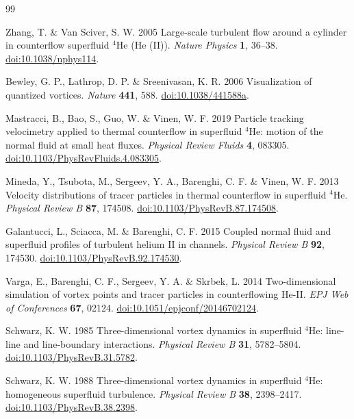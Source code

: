 \documentclass[11pt]{article}
\numberwithin{equation}{section}
\begin{document}
\begin{thebibliography}{99}

Zhang, T. \& Van Sciver, S. W. 2005
Large-scale turbulent flow around a cylinder in counterflow superfluid $^4$He (He (II)).
\textit{Nature Physics} \textbf{1}, 36--38.
\href{https://doi.org/10.1038/nphys114}{doi:10.1038/nphys114}.

Bewley, G. P., Lathrop, D. P. \& Sreenivasan, K. R. 2006
Visualization of quantized vortices.
\textit{Nature} \textbf{441}, 588.
\href{https://doi.org/10.1038/441588a}{doi:10.1038/441588a}.

Mastracci, B., Bao, S., Guo, W. \& Vinen, W. F. 2019
Particle tracking velocimetry applied to thermal counterflow in superfluid $^4$He:
motion of the normal fluid at small heat fluxes.
\textit{Physical Review Fluids} \textbf{4}, 083305.
\href{https://doi.org/10.1103/PhysRevFluids.4.083305}{doi:10.1103/PhysRevFluids.4.083305}.

Mineda, Y., Tsubota, M., Sergeev, Y. A., Barenghi, C. F. \& Vinen, W. F. 2013
Velocity distributions of tracer particles in thermal counterflow in superfluid $^4$He.
\textit{Physical Review B} \textbf{87}, 174508.
\href{https://doi.org/10.1103/PhysRevB.87.174508}{doi:10.1103/PhysRevB.87.174508}.

Galantucci, L., Sciacca, M. \& Barenghi, C. F. 2015
Coupled normal fluid and superfluid profiles of turbulent helium II in channels.
\textit{Physical Review B} \textbf{92}, 174530.
\href{https://doi.org/10.1103/PhysRevB.92.174530}{doi:10.1103/PhysRevB.92.174530}.

Varga, E., Barenghi, C. F., Sergeev, Y. A. \& Skrbek, L. 2014
Two-dimensional simulation of vortex points and tracer particles in counterflowing He-II.
\textit{EPJ Web of Conferences} \textbf{67}, 02124.
\href{https://doi.org/10.1051/epjconf/20146702124}{doi:10.1051/epjconf/20146702124}.

Schwarz, K. W. 1985
Three-dimensional vortex dynamics in superfluid $^4$He:
line-line and line-boundary interactions.
\textit{Physical Review B} \textbf{31}, 5782--5804.
\href{https://doi.org/10.1103/PhysRevB.31.5782}{doi:10.1103/PhysRevB.31.5782}.

Schwarz, K. W. 1988
Three-dimensional vortex dynamics in superfluid $^4$He:
homogeneous superfluid turbulence.
\textit{Physical Review B} \textbf{38}, 2398--2417.
\href{https://doi.org/10.1103/PhysRevB.38.2398}{doi:10.1103/PhysRevB.38.2398}.


\end{thebibliography}
\end{document}
